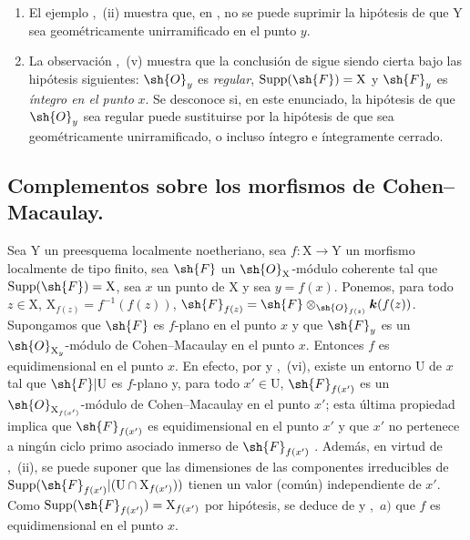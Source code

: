 \begin{remarks}[15.3.4]
\label{IV.15.3.4}
\begin{enumerate}[label=(\roman*)]
  \item El ejemplo ,~(ii) muestra que, en , no se puede suprimir la hipótesis de que $\mathrm{Y}$ sea geométricamente unirramificado en el punto $y$.
  \item La observación ,~(v) muestra que la conclusión de  sigue siendo cierta bajo las hipótesis siguientes: $\sh{O}_y$ es \emph{regular}, $\operatorname{Supp}(\sh{F})=\mathrm{X}$ y $\sh{F}_y$ es \emph{íntegro en el punto} $x$.
Se desconoce si, en este enunciado, la hipótesis de que $\sh{O}_y$ sea regular puede sustituirse por la hipótesis de que sea geométricamente unirramificado, o incluso íntegro e íntegramente cerrado.
\end{enumerate}
\end{remarks}

\subsection{Complementos sobre los morfismos de Cohen--Macaulay.}
\label{subsection:IV.15.4}

\begin{proposition}[15.4.1]
\label{IV.15.4.1}
Sea $\mathrm{Y}$ un preesquema localmente noetheriano, sea $f:\mathrm{X}\to\mathrm{Y}$ un morfismo localmente de tipo finito, sea $\sh{F}$ un $\sh{O}_\mathrm{X}$-módulo coherente tal que $\operatorname{Supp}(\sh{F})=\mathrm{X}$, sea $x$ un punto de $\mathrm{X}$ y sea $y=f(x)$.
Ponemos, para todo $z\in\mathrm{X}$, $\mathrm{X}_{f(z)}=f^{-1}(f(z))$, $\sh{F}_{f(z)}=\sh{F}\otimes_{\sh{O}_{f(z)}}\boldsymbol{k}(f(z))$.
Supongamos que $\sh{F}$ es $f$-plano en el punto $x$ y que $\sh{F}_y$ es un $\sh{O}_{\mathrm{X}_y}$-módulo de Cohen--Macaulay en el punto $x$.
Entonces $f$ es
equidimensional en el punto $x$.
En efecto, por  y ,~(vi), existe un entorno $\mathrm{U}$ de $x$ tal que $\sh{F}|\mathrm{U}$ es $f$-plano y, para todo $x'\in\mathrm{U}$, $\sh{F}_{f(x')}$ es un $\sh{O}_{\mathrm{X}_{f(x')}}$-módulo de Cohen--Macaulay en el punto $x'$; esta última propiedad implica que $\sh{F}_{f(x')}$ es equidimensional en el punto $x'$ y que $x'$ no pertenece a ningún ciclo primo asociado inmerso de $\sh{F}_{f(x')}$ .
Además, en virtud de ,~(ii), se puede suponer que las dimensiones de las componentes irreducibles de $\operatorname{Supp}(\sh{F}_{f(x')}|(\mathrm{U}\cap\mathrm{X}_{f(x')}))$ tienen un valor (común) independiente de $x'$.
Como $\operatorname{Supp}(\sh{F}_{f(x')})=\mathrm{X}_{f(x')}$ por hipótesis, se deduce de  y ,~$a)$ que $f$ es equidimensional en el punto $x$.
\end{proposition}

